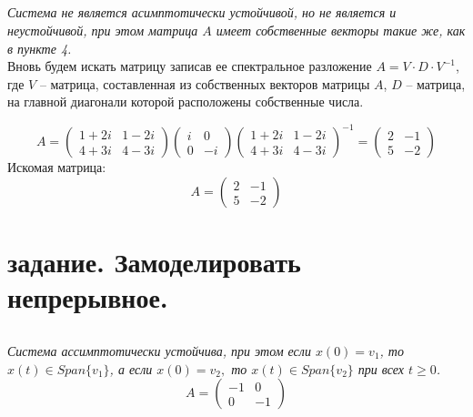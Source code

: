 \documentclass[a5paper, 10pt]{article}
\theoremstyle{definition}
\theoremstyle{plain}
\theoremstyle{remark}
\begin{document}
\subsection{}
\textit{Система не является асимптотически устойчивой, но не является и неустойчивой, при этом матрица $A$ имеет собственные векторы такие же, как в пункте 4.}\\

Вновь будем искать матрицу записав ее спектральное разложение $ A = V \cdot D \cdot V^{-1}$, где $V$ -- матрица, составленная из собственных векторов матрицы $A$, $D$ -- матрица, на главной диагонали которой расположены собственные числа.

\begin{equation}
A =
\begin{pmatrix}
1 + 2i &  1 - 2i \\
4 + 3i & 4 - 3i
\end{pmatrix}
\begin{pmatrix}
i &  0 \\
0 & -i
\end{pmatrix}
\begin{pmatrix}
1 + 2i &  1 - 2i \\
4 + 3i & 4 - 3i
\end{pmatrix}^{-1}
=
\begin{pmatrix}
2 & -1  \\
5 & -2
\end{pmatrix}
\end{equation}
Искомая матрица:
\begin{equation}
A =
\begin{pmatrix}
2 & -1  \\
5 & -2
\end{pmatrix}
\end{equation}


\newpage
\section{задание. Замоделировать непрерывное.}

\subsection{}
\textit{Система ассимптотически устойчива, при этом если $x(0) = v_1$, то $x(t) \in Span\{v_1\}$, а если $x(0) = v_2,$ то  $x(t) \in Span\{v_2\}$ при всех $t \geq 0$.}
\begin{equation}
A=
\begin{pmatrix}
-1 & 0\\
0 & -1
\end{pmatrix}
\end{equation}
\end{document}
